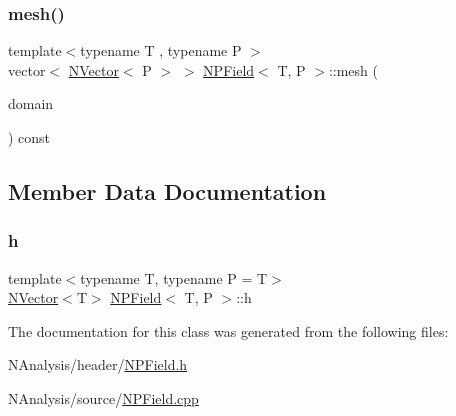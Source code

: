\subsubsection{\texorpdfstring{mesh()}{mesh()}}
{\footnotesize\ttfamily template$<$typename T , typename P $>$ \\
vector$<$ \mbox{\hyperlink{class_n_vector}{N\+Vector}}$<$ P $>$ $>$ \mbox{\hyperlink{class_n_p_field}{N\+P\+Field}}$<$ T, P $>$\+::mesh (\begin{DoxyParamCaption}\item[{const \mbox{\hyperlink{class_n_compact}{N\+Compact}} \&}]{domain }\end{DoxyParamCaption}) const\hspace{0.3cm}{\ttfamily [protected]}}



\subsection{Member Data Documentation}
\mbox{\label{class_n_p_field_a21a56864db47d8589ec917764e3b2b85}} 
\subsubsection{\texorpdfstring{h}{h}}
{\footnotesize\ttfamily template$<$typename T, typename P = T$>$ \\
\mbox{\hyperlink{class_n_vector}{N\+Vector}}$<$T$>$ \mbox{\hyperlink{class_n_p_field}{N\+P\+Field}}$<$ T, P $>$\+::h}



The documentation for this class was generated from the following files\+:\begin{DoxyCompactItemize}
\item 
N\+Analysis/header/\mbox{\hyperlink{_n_p_field_8h}{N\+P\+Field.\+h}}\item 
N\+Analysis/source/\mbox{\hyperlink{_n_p_field_8cpp}{N\+P\+Field.\+cpp}}\end{DoxyCompactItemize}
